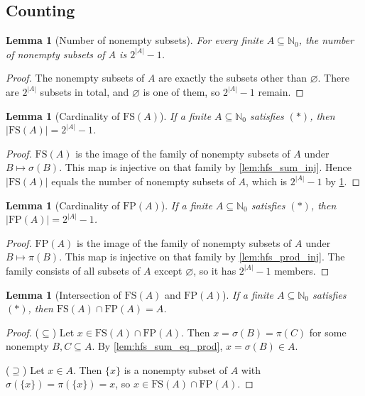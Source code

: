 \documentclass[11pt]{article}
\newtheorem{lemma}[theorem]{Lemma}
\theoremstyle{definition}
\theoremstyle{remark}
\newcommand{\FS}{\mathrm{FS}}
\newcommand{\FP}{\mathrm{FP}}
\newcommand{\Nz}{\mathbb{N}_0}
\begin{document}
\subsection{Counting}

\begin{lemma}[Number of nonempty subsets]\label{lem:hfs_card_nonempty}
For every finite $A\subseteq\Nz$, the number of nonempty subsets of $A$ is $2^{|A|}-1$.
\end{lemma}

\begin{proof}
The nonempty subsets of $A$ are exactly the subsets other than $\varnothing$. There are $2^{|A|}$ subsets in total, and $\varnothing$ is one of them, so $2^{|A|}-1$ remain.
\end{proof}

\begin{lemma}[Cardinality of $\FS(A)$]\label{lem:hfs_FS_card}
If a finite $A\subseteq\Nz$ satisfies $(\ast)$, then $|\FS(A)|=2^{|A|}-1$.
\end{lemma}

\begin{proof}
$\FS(A)$ is the image of the family of nonempty subsets of $A$ under $B\mapsto\sigma(B)$. This map is injective on that family by \cref{lem:hfs_sum_inj}. Hence $|\FS(A)|$ equals the number of nonempty subsets of $A$, which is $2^{|A|}-1$ by \cref{lem:hfs_card_nonempty}.
\end{proof}

\begin{lemma}[Cardinality of $\FP(A)$]\label{lem:hfs_FP_card}
If a finite $A\subseteq\Nz$ satisfies $(\ast)$, then $|\FP(A)|=2^{|A|}-1$.
\end{lemma}

\begin{proof}
$\FP(A)$ is the image of the family of nonempty subsets of $A$ under $B\mapsto\pi(B)$. This map is injective on that family by \cref{lem:hfs_prod_inj}. The family consists of all subsets of $A$ except $\varnothing$, so it has $2^{|A|}-1$ members.
\end{proof}

\begin{lemma}[Intersection of $\FS(A)$ and $\FP(A)$]\label{lem:hfs_inter}
If a finite $A\subseteq\Nz$ satisfies $(\ast)$, then $\FS(A)\cap\FP(A)=A$.
\end{lemma}

\begin{proof}
($\subseteq$) Let $x\in\FS(A)\cap\FP(A)$. Then $x=\sigma(B)=\pi(C)$ for some nonempty $B,C\subseteq A$. By \cref{lem:hfs_sum_eq_prod}, $x=\sigma(B)\in A$.

($\supseteq$) Let $x\in A$. Then $\{x\}$ is a nonempty subset of $A$ with $\sigma(\{x\})=\pi(\{x\})=x$, so $x\in\FS(A)\cap\FP(A)$.
\end{proof}
\end{document}
